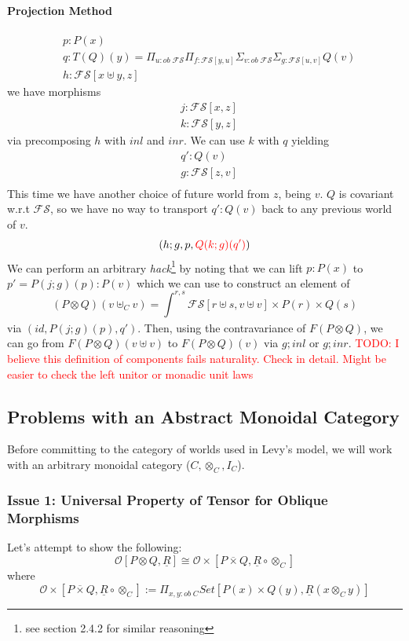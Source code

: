 \documentclass{article}
\newcommand{\red}[1]{\textcolor{red}{#1}}
\begin{document}
\paragraph{Projection Method}
\begin{align*}
    &p : P(x)\\
    &q : T(Q)(y) = \Pi_{u : ob \; \mathcal{FS}}\Pi_{f : \mathcal{FS}[ y , u]}\Sigma_{v : ob \;\mathcal{FS}}\Sigma_{g : \mathcal{FS}[ u , v ]}Q(v)\\
    &h : \mathcal{FS}[x\uplus y , z]
\end{align*}
we have morphisms
\begin{align*}
    & j : \mathcal{FS}[x , z]\\
    & k : \mathcal{FS}[y , z]
\end{align*}
via precomposing $h$ with $inl$ and $inr$. We can use $k$ with $q$ yielding
\begin{align*}
    &q' : Q(v)\\
    &g : \mathcal{FS}[ z , v ]\\
\end{align*}
This time we have another choice of future world from $z$, being $v$. 
$Q$ is covariant w.r.t $\mathcal{FS}$, so we have no way to transport $q' : Q(v)$ back to any
previous world of $v$.
\[
  (h ; g , p, \red{Q(k ; g)(q')})  
\]
We can perform an arbitrary \textit{hack}\footnote{see section 2.4.2 for similar reasoning}
by noting that we can lift $p: P(x)$ to $p' = P(j ; g)(p) : P(v)$ which we can use to construct an element of 
\[
    (P \otimes Q)(v \uplus_C v) = \int_{}^{r,s} \mathcal{FS}[r \uplus s, v \uplus v] 
    \times P(r) \times Q(s)
\]
via $(id, P(j ; g)(p), q')$. 
Then, using the contravariance of $F(P \otimes Q)$, 
we can go from $F(P \otimes Q)(v \uplus v)$ to $F(P \otimes Q)(v)$ via $g ; inl$ or $g ; inr$.
\red{TODO: I believe this definition of components fails naturality. Check in detail. 
Might be easier to check the left unitor or monadic unit laws}



\subsection{Problems with an Abstract Monoidal Category}
Before committing to the category 
of worlds used in Levy's model, we will work with an arbitrary monoidal category ($C, \otimes_C , I_C$). 
\subsubsection{Issue 1: Universal Property of Tensor for Oblique Morphisms}
Let's attempt to show the following:
\[
  \mathcal{O}[P \otimes Q , \underline{R}] \cong \mathcal{O\times}[P \overline{\times} Q , \underline{R} \circ \otimes_C]  
\]
where 
\[
    \mathcal{O\times}[P \overline{\times} Q , \underline{R} \circ \otimes_C] 
    := \Pi_{x , y : ob \;C}Set[P(x)\times Q(y) , \underline{R}(x \otimes_C y)]
\]
\end{document}
